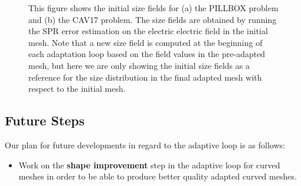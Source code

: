 \documentclass[review,12pt]{elsarticle_summary_report}
\begin{document}
\begin{figure}[ph!]
\centering
{}
\caption{\label{size_fields} This figure shows the initial size fields for (a) the PILLBOX problem and (b) the CAV17 problem. The size fields are obtained by running the SPR error estimation on the electric electric field in the initial mesh. Note that a new size field is computed at the beginning of each adaptation loop based on the field values in the pre-adapted mesh, but here we are only showing the initial size fields as a reference for the size distribution in the final adapted mesh with respect to the initial mesh.}
\end{figure}

\subsection{\label{adaptive_loop_future} Future Steps}

Our plan for future developments in regard to the adaptive loop is as follows:
\begin{itemize}
  \item Work on the \textbf{shape improvement} step in the adaptive loop for curved meshes in order to be able to produce better quality adapted curved meshes.
\end{itemize}
\end{document}

